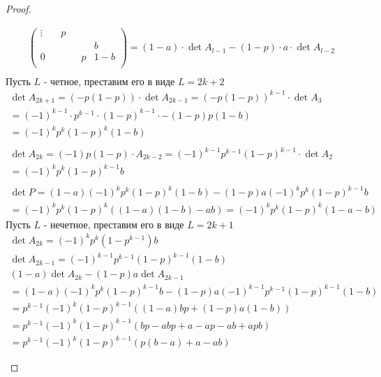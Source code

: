 \begin{proof}
\begin{itemize}
\begin{gather*}
\begin{pmatrix}
                \vdots & & p & & &\\
                & & & & & b\\
                0 & & & & p & 1-b\\
            \end{pmatrix}
            = (1-a) \cdot \det A_{l-1} - (1-p) \cdot a \cdot \det A_{l-2}\\
            \end{gather*}
            Пусть $L$ - четное, преставим его в виде $L = 2k + 2$
            \begin{gather*}
                \det A_{2k + 1} = (-p(1-p)) \cdot \det A_{2k-1}
                = (-p(1-p))^{k-1} \cdot \det A_{3}\\
                = (-1)^{k-1} \cdot p^{k-1} \cdot (1-p)^{k-1} \cdot -(1-p) p (1-b)\\
                = (-1)^{k} p^{k} (1-p)^{k} (1-b)\\
                \\
                \det A_{2k} = (-1)p(1-p) \cdot A_{2k-2}
                = (-1)^{k-1} p^{k-1} (1-p)^{k-1} \cdot \det A_{2}\\
                = (-1)^{k} p ^{k} (1-p)^{k-1} b\\
                \\
                \det P
                = (1-a)(-1)^{k} p^{k} (1-p)^{k} (1-b) - (1-p) a (-1)^{k} p^{k} (1-p)^{k-1} b\\
                = (-1)^{k} p^{k} (1-p)^{k} ((1-a)(1-b) - ab)
                = (-1)^{k} p^{k} (1-p)^{k} (1 - a - b)
            \end{gather*}
            Пусть $L$ - нечетное, преставим его в виде $L = 2k + 1$
            \begin{gather*}
                \det A_{2k} = (-1)^{k} p^{k} (1-p^{k-1}) b\\
                \det A_{2k-1} = (-1)^{k-1} p^{k-1} (1-p)^{k-1} (1-b)\\
                (1-a) \det A_{2k} - (1-p) a \det A_{2k-1}\\
                = (1-a) (-1)^{k} p^{k} (1-p)^{k-1} b - (1-p) a (-1)^{k-1} p^{k-1} (1-p)^{k-1} (1-b)\\
                = p^{k-1} (-1)^{k} (1-p)^{k-1} \left((1-a) b p + (1-p) a (1-b)\right)\\
                = p^{k-1} (-1)^{k} (1-p)^{k-1} (bp - abp + a - ap - ab + apb)\\
                = p^{k-1} (-1)^{k} (1-p)^{k-1} (p(b-a) + a - ab)
            \end{gather*}

\end{itemize}
\end{proof}
